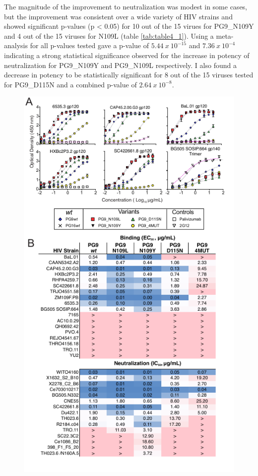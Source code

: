 The magnitude of the improvement to neutralization was modest in some cases, but the improvement was consistent over a wide variety of HIV strains and showed significant p-values (p < 0.05) for 10 out of the 15 virues for PG9\_N109Y and 4 out of the 15 viruses for N109L (table \ref{tab:table4_1}). Using a meta-analysis for all p-values tested gave a p-value of $5.44~x~10^{-15}$ and $7.36~x~10^{-4}$ indicating a strong statistical significance observed for the increase in potency of neutralization for PG9\_N109Y and PG9\_N109L respectively. I also found a decrease in potency to be statistically significant for 8 out of the 15 viruses tested for PG9\_D115N and a combined p-value of $2.64~x~10^{-8}$.


\begin{figure}[!t]
   \centering
   \includegraphics[scale=1.3]{images/chapter4/figure4_4.pdf} %

\end{figure}
